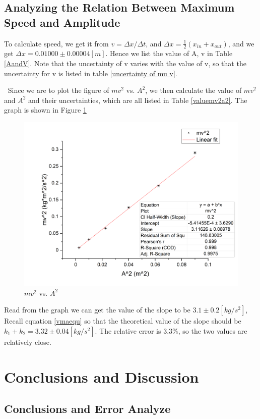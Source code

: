 \documentclass[11pt,a4paper]{article}
\begin{document}
\subsection{Analyzing the Relation Between Maximum Speed and Amplitude}
\qquad To calculate speed, we get it from $v=\Delta x/\Delta t$, and $\Delta x=\frac{1}{2}(x_{in}+x_{out})$, and we get $\Delta x=0.01000\pm 0.00004[m]$. Hence we list the value of A, v in Table \ref{AandV}. Note that the uncertainty of v varies with the value of v, so that the uncertainty for v is listed in table \ref{uncertainty of mu v}.\par
$\ $ Since we are to plot the figure of $mv^2$ vs. $A^2$, we then calculate the value of $mv^2$ and $A^2$ and their uncertainties, which are all listed in Table \ref{valuemv2a2}. The graph is shown in Figure \ref{mva}
\begin{figure}[H]
    \centering
    \includegraphics[scale=0.35]{mv2A2.png}
    \caption{$mv^2$ vs. $A^2$}
    \label{mva}
\end{figure}
\qquad Read from the graph we can get the value of the slope to be $3.1\pm 0.2[kg/s^2]$, Recall equation \ref{vmaequ} so that the theoretical value of the slope should be $k_1+k_2=3.32\pm 0.04[kg/s^2]$. The relative error is $3.3\%$, so the two values are relatively close.
\section{Conclusions and Discussion}
\subsection{Conclusions and Error Analyze}
\end{document}
